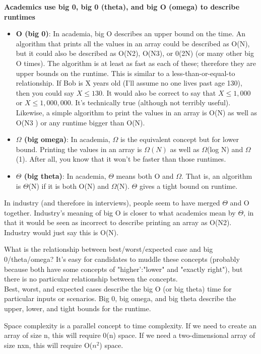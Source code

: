 \documentclass[14pt, noindent]{article}
\begin{document}
\large \textbf{Academics use big 0, big 0 (theta), and big O (omega) to describe runtimes}\\
\begin{itemize}
\item \textbf{O (big 0)}: In academia, big O describes an upper bound on the time. An algorithm that prints
all the values in an array could be described as O(N), but it could also be described as O(N2), O(N3),
or 0(2N) (or many other big O times). The algorithm is at least as fast as each of these; therefore
they are upper bounds on the runtime. This is similar to a less-than-or-equal-to relationship. If Bob
is X years old (I'll assume no one lives past age 130), then you could say $X \leq 130$. It would also
be correct to say that $X \leq 1,000$ or $X \leq 1,000,000$. It's technically true (although not terribly
useful). Likewise, a simple algorithm to print the values in an array is O(N) as well as O(N3 ) or any
runtime bigger than O(N).
\item \textbf{$\Omega$ (big omega)}: In academia, $\Omega$ is the equivalent concept but for lower bound.
Printing the values in an array is $\Omega(N)$ as well as $\Omega$(log N) and $\Omega$(1). After all,
you know that it won't be faster than those runtimes.
\item \textbf{$\Theta$ (big theta)}: In academia, $\Theta$ means both O and $\Omega$. That is, an
algorithm is $\Theta$(N) if it is both O(N) and $\Omega$(N). $\Theta$ gives a tight bound on runtime.
\end{itemize}

In industry (and therefore in interviews), people seem to have merged $\Theta$ and O together.
Industry's meaning of big O is closer to what academics mean by $\Theta$, in that it would be seen
as incorrect to describe printing an array as O(N2). Industry would just say this is O(N).

\vspace{20pt}
What is the relationship between best/worst/expected case and big 0/theta/omega?
It's easy for candidates to muddle these concepts (probably because both have some concepts of
"higher':"lower" and "exactly right"), but there is no particular relationship between the concepts.\\
Best, worst, and expected cases describe the big O (or big theta) time for particular inputs or
scenarios. Big 0, big omega, and big theta describe the upper, lower, and tight bounds for the runtime.

\vspace{20pt}
Space complexity is a parallel concept to time complexity. If we need to create an array of size n,
this will require 0(n) space. If we need a two-dimensional array of size nxn, this will require
O($n^2$) space.
\end{document}
